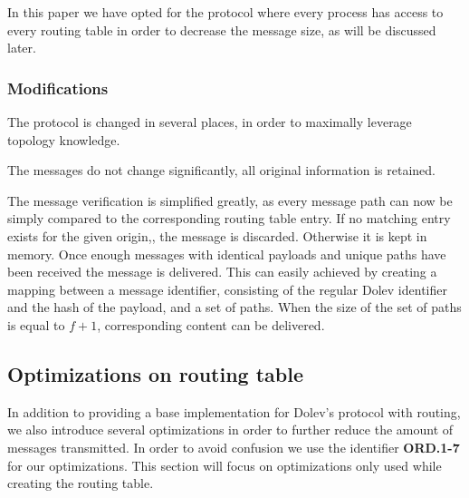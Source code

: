 In this paper we have opted for the protocol where every process has access to every routing table in order to decrease the message size, as will be discussed later.

\subsubsection{Modifications}
The protocol is changed in several places, in order to maximally leverage topology knowledge. 

The messages do not change significantly, all original information is retained.

The message verification is simplified greatly, as every message path can now be simply compared to the corresponding routing table entry. If no matching entry exists for the given origin,, the message is discarded. Otherwise it is kept in memory. Once enough messages with identical payloads and unique paths have been received the message is delivered. This can easily achieved by creating a mapping between a message identifier, consisting of the regular Dolev identifier and the hash of the payload, and a set of paths. When the size of the set of paths is equal to $f+1$, corresponding content can be delivered.


\subsection{Optimizations on routing table}
In addition to providing a base implementation for Dolev's protocol with routing, we also introduce several optimizations in order to further reduce the amount of messages transmitted. In order to avoid confusion we use the identifier \textbf{ORD.1-7} for our optimizations. This section will focus on optimizations only used while creating the routing table.


